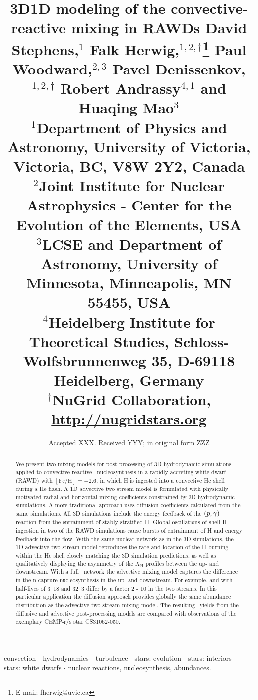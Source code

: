 \documentclass[fleqn,usenatbib]{mnras}
\title[3D1D modeling of the convective-reactive mixing in RAWDs]{3D1D
  modeling of the convective-reactive mixing in RAWDs} \title[3D1D
\author[D. Stephens et al.]{
David Stephens,$^{1}$
Falk Herwig,$^{1,2,\dagger}$\thanks{E-mail: fherwig@uvic.ca}
Paul Woodward,$^{2,3}$
Pavel Denissenkov,$^{1,2,\dagger}$
\newauthor
 Robert Andrassy$^{4,1}$ 
and Huaqing Mao$^{3}$\\
$^{1}$Department of Physics and Astronomy, University of Victoria, Victoria, BC, V8W 2Y2, Canada\\
$^{2}$Joint Institute for Nuclear Astrophysics - Center for the Evolution of the Elements, USA\\
$^{3}$LCSE and Department of Astronomy, University of Minnesota, Minneapolis, MN 55455, USA\\
$^{4}$Heidelberg Institute for Theoretical Studies, Schloss-Wolfsbrunnenweg 35, D-69118 Heidelberg, Germany\\
$^\dagger$NuGrid Collaboration, \href{http://nugridstars.org}{http://nugridstars.org}\\}
\date{Accepted XXX. Received YYY; in original form ZZZ}
\begin{document}
\label{firstpage}
\pagerange{\pageref{firstpage}--\pageref{lastpage}}
\maketitle

\begin{abstract}
We present two mixing models for post-processing of 3D hydrodynamic
simulations applied to convective-reactive \ipr\ nucleosynthesis in a
rapidly accreting white dwarf (RAWD) with $\mathrm{[Fe/H]} = -2.6$, in
which H is ingested into a convective He shell during a He flash. A 1D
advective two-stream model is formulated with physically motivated
radial and horizontal mixing coefficients constrained by 3D
hydrodynamic simulations. A more traditional approach uses diffusion
coefficients calculated from the same simulations. All 3D simulations
include the energy feedback of the
$(p,\gamma)$ reaction from the
entrainment of stably stratified H. Global oscillations of shell H
ingestion in two of the RAWD simulations cause bursts of
entrainment of H and energy feedback into the flow. With the same
nuclear network as in the 3D simulations, the 1D advective two-stream
model reproduces the rate and location of the H burning within the He
shell closely matching the 3D simulation predictions, as well as
qualitatively displaying the asymmetry of the $X_{\mathrm{H}}$
profiles between the up- and downstream. With a full \ipr\ network
the advective mixing model captures the difference in the n-capture
nucleosynthesis in the up- and downstream. For example,
 and  with half-lives of
\unit{3.18}{\minute} and \unit{32.3}{\second} differ by a factor 2 - 10 in the
two streams. In this particular application the diffusion approach
provides globally the same abundance distribution as the advective
two-stream mixing model. The resulting \ipr\ yields from the diffusive
and advective post-processing models are compared with observations of
the exemplary CEMP-r/s star CS31062-050.


\end{abstract}

\begin{keywords}
convection - hydrodynamics - turbulence - stars: evolution - stars: interiors - stars: white dwarfs - nuclear reactions, nucleosynthesis, abundances.
\end{keywords}
\end{document}
